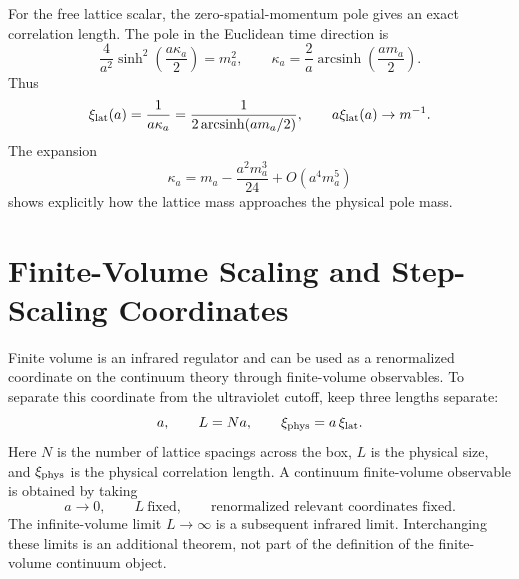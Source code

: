 For the free lattice scalar, the zero-spatial-momentum pole gives an exact
correlation length.  The pole in the Euclidean time direction is
\[
  \frac{4}{a^2}\sinh^2\!\left(\frac{a\kappa_a}{2}\right)=m_a^2,
  \qquad
  \kappa_a=\frac{2}{a}\operatorname{arcsinh}\!\left(\frac{am_a}{2}\right).
\]
Thus
\begin{equation}
  \xi_{\rm lat}(a)=\frac{1}{a\kappa_a}
  =
  \frac{1}{2\operatorname{arcsinh}(am_a/2)},
  \qquad
  a\xi_{\rm lat}(a)\to m^{-1}.
  \label{eq:continuum-limit-free-scalar-correlation-length}
\end{equation}
The expansion
\[
  \kappa_a=m_a-\frac{a^2m_a^3}{24}+O(a^4m_a^5)
\]
shows explicitly how the lattice mass approaches the physical pole mass.

\section{Finite-Volume Scaling and Step-Scaling Coordinates}
\label{sec:finite-volume-scaling-step-scaling-coordinates}

Finite volume is an infrared regulator and can be used as a renormalized
coordinate on the continuum theory through finite-volume observables.  To
separate this coordinate from the ultraviolet cutoff, keep three lengths
separate:
\[
  a,\qquad L=Na,\qquad \xi_{\rm phys}=a\,\xi_{\rm lat}.
\]
Here \(N\) is the number of lattice spacings across the box, \(L\) is the
physical size, and \(\xi_{\rm phys}\) is the physical correlation length.
A continuum finite-volume observable is obtained by taking
\[
  a\to0,\qquad L\ \text{fixed},\qquad
  \text{renormalized relevant coordinates fixed}.
\]
The infinite-volume limit \(L\to\infty\) is a subsequent infrared limit.
Interchanging these limits is an additional theorem, not part of the
definition of the finite-volume continuum object.

